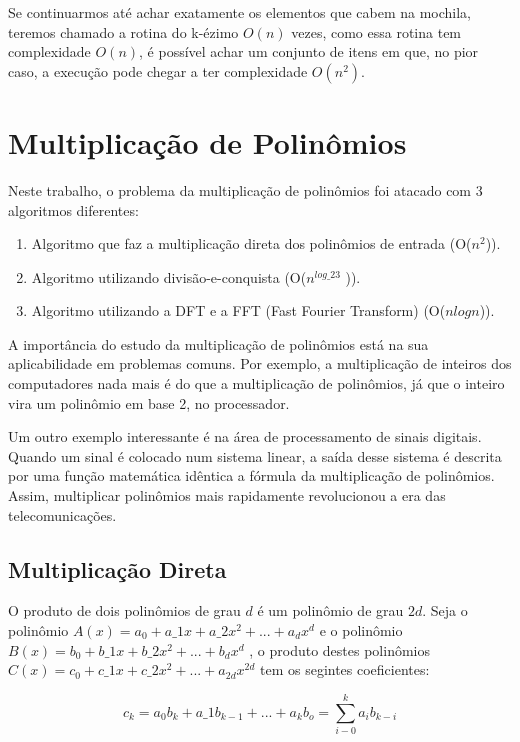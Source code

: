 \documentclass[
	12pt,				%
	oneside,			%
	a4paper,			%
	english,			%
	french,				%
	spanish,			%
	brazil,				%
	]{abntex2}
\begin{document}
Se continuarmos até achar exatamente os elementos que cabem na mochila, teremos chamado a rotina do k-ézimo $O(n)$ vezes, como essa rotina tem complexidade $O(n)$, é possível achar um conjunto de itens em que, no pior caso, a execução pode chegar a ter complexidade $O(n^2)$.


\chapter[Multiplicação de Polinômios]{Multiplicação de Polinômios}

Neste trabalho, o problema da multiplicação de polinômios foi atacado com 3 algoritmos diferentes:

\begin{enumerate}
    \item Algoritmo que faz a multiplicação direta dos polinômios de entrada (O($n^2
$)).
    \item  Algoritmo utilizando divisão-e-conquista (O($n^{log\_23}$
)).
    \item  Algoritmo utilizando a DFT e a FFT (Fast Fourier Transform) (O($nlogn$)).
\end{enumerate}

A importância do estudo da multiplicação de polinômios está na sua aplicabilidade em problemas comuns. Por exemplo, a multiplicação de inteiros dos computadores nada mais é do que a multiplicação de polinômios, já que o inteiro vira um polinômio em base 2, no processador.

Um outro exemplo interessante é na área de processamento de sinais digitais. Quando um sinal é colocado num sistema linear, a saída desse sistema é descrita por uma função matemática idêntica a fórmula da multiplicação de polinômios. Assim, multiplicar polinômios mais rapidamente revolucionou a era das telecomunicações. \cite{dasgupta2006}

\section{Multiplicação Direta}

O produto de dois polinômios de grau $d$ é um polinômio de grau $2d$. Seja o polinômio $A(x) = a_0 + a\_1x + a\_2x^2 + ... + a_{d}x^d$ e o polinômio $B(x) = b_0 + b\_1x + b\_2x^2 + ... + b_{d}x^d$ , o produto destes polinômios $C(x) = c_0 + c\_1x + c\_2x^2 + ...  + a_{2d}x^{2d}$  tem os segintes coeficientes:

\[c_k = a_0b_k + a\_1b_{k-1} + ... + a_kb_o = \sum_{i-0}^{k}{a_ib_{k-i}}\]
\end{document}

